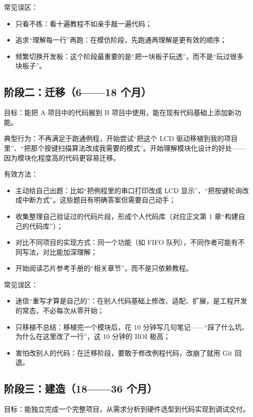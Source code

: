 常见误区：
\begin{itemize}
	\item 只看不练：看十遍教程不如亲手敲一遍代码；
	\item 追求“理解每一行”再跑：在模仿阶段，先跑通再理解是更有效的顺序；
	\item 频繁切换开发板：这个阶段最重要的是“把一块板子玩透”，而不是“玩过很多块板子”。
\end{itemize}

\subsection*{阶段二：迁移（6——18 个月）}

目标：能把 A 项目中的代码搬到 B 项目中使用，能在现有代码基础上添加新功能。

典型行为：不再满足于跑通例程，开始尝试“把这个 LCD 驱动移植到我的项目里”、“把那个按键扫描算法改成我需要的模式”。开始理解模块化设计的好处——因为模块化程度高的代码更容易迁移。

有效方法：
\begin{itemize}
	\item 主动给自己出题：比如“把例程里的串口打印改成 LCD 显示”、“把按键轮询改成中断方式”。这些题目有明确答案但需要自己动手；
	\item 收集整理自己验证过的代码片段，形成个人代码库（对应正文第 1 章“构建自己的代码库”）；
	\item 对比不同项目的实现方式：同一个功能（如 FIFO 队列），不同作者可能有不同写法，对比能加深理解；
	\item 开始阅读芯片参考手册的“相关章节”，而不是只依赖教程。
\end{itemize}

常见误区：
\begin{itemize}
	\item 迷信“重写才算是自己的”：在别人代码基础上修改、适配、扩展，是工程开发的常态，不必每次从零开始；
	\item 只移植不总结：移植完一个模块后，花 10 分钟写几句笔记——“踩了什么坑、为什么在这里改了一行”，这 10 分钟的 ROI 极高；
	\item 害怕改别人的代码：在迁移阶段，要敢于修改例程代码，改崩了就用 Git 回退。
\end{itemize}

\subsection*{阶段三：建造（18——36 个月）}

目标：能独立完成一个完整项目，从需求分析到硬件选型到代码实现到调试交付。

